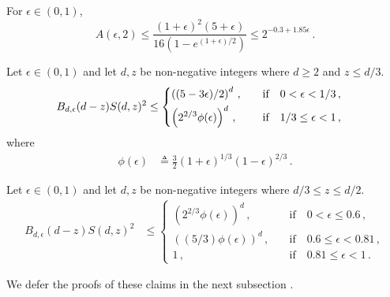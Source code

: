 \begin{claim}\label{claim:multiple-honest-blocks}
  For $\epsilon \in (0, 1)$, 
  $$
    A(\epsilon, 2) 
    \leq 
    \frac{(1 + \epsilon)^2 (5 + \epsilon)}{16 \left( 1 - e^{(1 + \epsilon)/2} \right)}
    \leq 2^{- 0.3 + 1.85 \epsilon}
    \,.
  $$
\end{claim}






\begin{claim}\label{claim:t1star-variance-exact}
  Let $\epsilon \in (0,1)$ and 
  let $d,z$ be non-negative integers where $d \geq 2$ and $z \leq d/3$. 
  \begin{align*}
    B_{d, \epsilon}(d-z) S(d,z)^2
    &\leq \begin{dcases} 
    \left( (5-3 \epsilon)/2 \right)^d \,,
        &\quad \text{if}\quad
        0 < \epsilon < 1/3 \,, \\
    \left( 2^{2/3} \phi(\epsilon) \right)^d \,,
        &\quad \text{if}\quad
        1/3 \leq \epsilon < 1 \, ,
    \end{dcases}
  \end{align*}
  where
  \begin{align}
    \phi(\epsilon) 
    &\triangleq \frac{3}{2} (1+\epsilon)^{1/3} (1-\epsilon)^{2/3}\label{eq:phi_eps} 
    \,.
  \end{align}
\end{claim}

\begin{claim}\label{claim:t2star-variance-exact}
  Let $\epsilon \in (0,1)$ and 
  let $d,z$ be non-negative integers where $d/3 \leq z \leq d/2$. 
  \begin{align*}
    B_{d, \epsilon}(d-z) S(d,z)^2
    &\leq \begin{cases} 
    \left( 2^{2/3} \phi(\epsilon) \right)^d \,,
        &\quad\text{if}\quad 0 < \epsilon \leq 0.6\,, \\
    \left( (5/3) \phi(\epsilon)  \right)^d \,,
        &\quad\text{if}\quad 0.6\leq \epsilon < 0.81\,, \\
    1 \,,
        &\quad\text{if}\quad 0.81 \leq \epsilon < 1
        \,.
    \end{cases}
  \end{align*}
\end{claim}
We defer the proofs of these claims in the next subsection .


